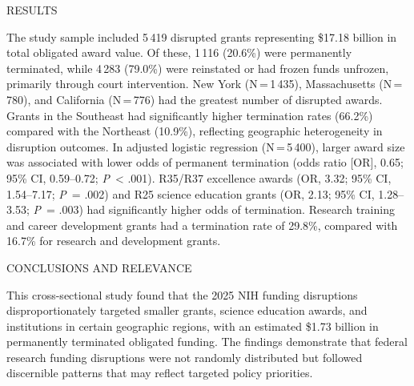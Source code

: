 \documentclass[10pt, letterpaper]{article}
\newcommand{\abslabel}[1]{%
  {\vspace{4pt}\noindent\sffamily\fontseries{b}\selectfont\fontsize{8.5}{10}\selectfont #1\enspace}%
}
\newcommand{\absrule}{%
  \vspace{3pt}\noindent{\color{jamacrimson}\rule{0.62\textwidth}{0.4pt}}\vspace{3pt}%
}
\begin{document}
\begin{minipage}[t]{0.62\textwidth}
\absrule

\abslabel{RESULTS}
{\fontsize{9}{11.5}\selectfont
The study sample included 5\,419 disrupted grants representing \$17.18 billion in total obligated award value. Of these, 1\,116 (20.6\%) were permanently terminated, while 4\,283 (79.0\%) were reinstated or had frozen funds unfrozen, primarily through court intervention. New York (N\,=\,1\,435), Massachusetts (N\,=\,780), and California (N\,=\,776) had the greatest number of disrupted awards. Grants in the Southeast had significantly higher termination rates (66.2\%) compared with the Northeast (10.9\%), reflecting geographic heterogeneity in disruption outcomes. In adjusted logistic regression (N\,=\,5\,400), larger award size was associated with lower odds of permanent termination (odds ratio [OR], 0.65; 95\% CI, 0.59--0.72; \textit{P}~< .001). R35/R37 excellence awards (OR, 3.32; 95\% CI, 1.54--7.17; \textit{P}~= .002) and R25 science education grants (OR, 2.13; 95\% CI, 1.28--3.53; \textit{P}~= .003) had significantly higher odds of termination. Research training and career development grants had a termination rate of 29.8\%, compared with 16.7\% for research and development grants.\par}

\absrule

\abslabel{CONCLUSIONS AND RELEVANCE}
{\fontsize{9}{11.5}\selectfont
This cross-sectional study found that the 2025 NIH funding disruptions disproportionately targeted smaller grants, science education awards, and institutions in certain geographic regions, with an estimated \$1.73 billion in permanently terminated obligated funding. The findings demonstrate that federal research funding disruptions were not randomly distributed but followed discernible patterns that may reflect targeted policy priorities.\par}

\vspace{4pt}
\noindent{\color{jamalightgray}\rule{0.62\textwidth}{0.4pt}}

\end{minipage}%
\hfill
\end{document}
